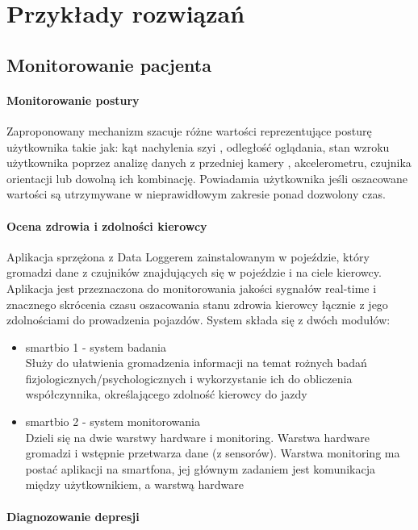 \documentclass[11pt,twoside,a4paper]
{article}
\begin{document}
\section{Przykłady rozwiązań}
\subsection{Monitorowanie pacjenta}
\paragraph{Monitorowanie postury \cite{Lee:2012:MPM:2370216.2370320}\\}
Zaproponowany mechanizm szacuje różne wartości reprezentujące posturę użytkownika takie jak: kąt nachylenia szyi , odległość oglądania, stan wzroku użytkownika poprzez analizę danych z przedniej kamery , akcelerometru, czujnika orientacji lub dowolną ich kombinację. Powiadamia użytkownika jeśli oszacowane
wartości są utrzymywane w nieprawidłowym zakresie ponad dozwolony czas.

\paragraph{Ocena zdrowia i zdolności kierowcy \cite{6583819}\\}
Aplikacja sprzężona z Data Loggerem zainstalowanym w pojeździe, który gromadzi dane z czujników znajdujących się w pojeździe i na ciele kierowcy. Aplikacja jest przeznaczona do monitorowania jakości sygnałów real-time i znacznego skrócenia czasu oszacowania stanu zdrowia kierowcy łącznie z jego zdolnościami do prowadzenia pojazdów. System składa się z dwóch modułów:
\begin{itemize}
\item smartbio 1 - system badania\\
Służy do ułatwienia gromadzenia informacji na temat rożnych badań fizjologicznych/psychologicznych i wykorzystanie ich do obliczenia współczynnika, określającego zdolność kierowcy do jazdy

\item smartbio 2 - system monitorowania\\
Dzieli się na dwie warstwy hardware i monitoring. Warstwa hardware gromadzi i wstępnie przetwarza dane (z sensorów). Warstwa monitoring ma postać aplikacji na smartfona, jej głównym zadaniem jest komunikacja między użytkownikiem, a warstwą hardware
\end{itemize}

\paragraph{Diagnozowanie depresji \cite{5291726}\\}
 
\end{document}
